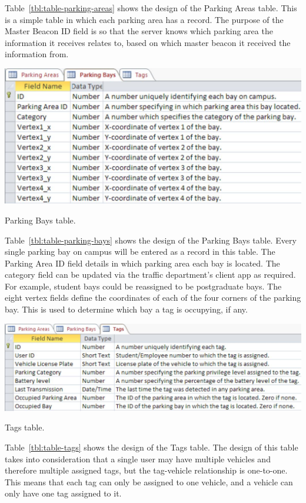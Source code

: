 Table~\ref{tbl:table-parking-areas} shows the design of the Parking Areas table. This is a simple table in which each parking area has a record. The purpose of the Master Beacon ID field is so that the server knows which parking area the information it receives relates to, based on which master beacon it received the information from.


\begin{table}[H]
\begin{center}
\includegraphics[scale=0.5]{data/software/6.jpg}
\caption{Parking Bays table.}
\label{tbl:table-parking-bays}
\end{center}
\end{table}

Table~\ref{tbl:table-parking-bays} shows the design of the Parking Bays table. Every single parking bay on campus will be entered as a record in this table. The Parking Area ID field details in which parking area each bay is located. The category field can be updated via the traffic department's client app as required. For example, student bays could be reassigned to be postgraduate bays. The eight vertex fields define the coordinates of each of the four corners of the parking bay. This is used to determine which bay a tag is occupying, if any.

\newpage
{}
\begin{table}[H]
\begin{center}
\includegraphics[scale=0.37]{data/software/7.jpg}
\caption{Tags table.}
\label{tbl:table-tags}
\end{center}
\end{table}
Table~\ref{tbl:table-tags} shows the design of the Tags table. The design of this table takes into consideration that a single user may have multiple vehicles and therefore multiple assigned tags, but the tag-vehicle relationship is one-to-one. This means that each tag can only be assigned to one vehicle, and a vehicle can only have one tag assigned to it.

